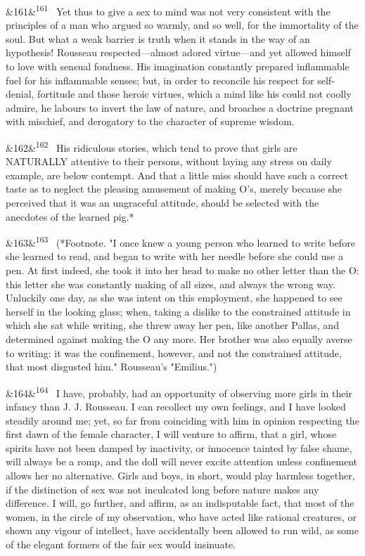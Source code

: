 \documentclass[12pt]{article}
\newcommand{\para}[1][]{\par\noindent\ifx&#1&\else\textsuperscript{\footnotesize #1}~\fi}
\begin{document}
\para[161] Yet thus to give a sex to mind was not very consistent with the principles of a man who argued so warmly, and so well, for the immortality of the soul. But what a weak barrier is truth when it stands in the way of an hypothesis! Rousseau respected---almost adored virtue---and yet allowed himself to love with sensual fondness. His imagination constantly prepared inflammable fuel for his inflammable senses; but, in order to reconcile his respect for self-denial, fortitude and those heroic virtues, which a mind like his could not coolly admire, he labours to invert the law of nature, and broaches a doctrine pregnant with mischief, and derogatory to the character of supreme wisdom.

\para[162] His ridiculous stories, which tend to prove that girls are NATURALLY attentive to their persons, without laying any stress on daily example, are below contempt. And that a little miss should have such a correct taste as to neglect the pleasing amusement of making O's, merely because she perceived that it was an ungraceful attitude, should be selected with the anecdotes of the learned pig.*

\para[163] (*Footnote. "I once knew a young person who learned to write before she learned to read, and began to write with her needle before she could use a pen. At first indeed, she took it into her head to make no other letter than the O: this letter she was constantly making of all sizes, and always the wrong way. Unluckily one day, as she was intent on this employment, she happened to see herself in the looking glass; when, taking a dislike to the constrained attitude in which she sat while writing, she threw away her pen, like another Pallas, and determined against making the O any more. Her brother was also equally averse to writing: it was the confinement, however, and not the constrained attitude, that most disgusted him." Rousseau's "Emilius.")

\para[164] I have, probably, had an opportunity of observing more girls in their infancy than J. J. Rousseau. I can recollect my own feelings, and I have looked steadily around me; yet, so far from coinciding with him in opinion respecting the first dawn of the female character, I will venture to affirm, that a girl, whose spirits have not been damped by inactivity, or innocence tainted by false shame, will always be a romp, and the doll will never excite attention unless confinement allows her no alternative. Girls and boys, in short, would play harmless together, if the distinction of sex was not inculcated long before nature makes any difference. I will, go further, and affirm, as an indisputable fact, that most of the women, in the circle of my observation, who have acted like rational creatures, or shown any vigour of intellect, have accidentally been allowed to run wild, as some of the elegant formers of the fair sex would insinuate.
\end{document}
